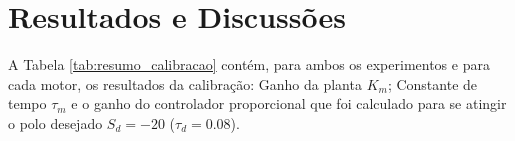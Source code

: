 \chapter[Resultados]{Resultados e Discussões}
\label{ch:resultados}






A Tabela \ref{tab:resumo_calibracao} contém, para ambos os experimentos e para cada motor, os resultados da calibração: Ganho da planta $K_m$; Constante de tempo $\tau_m$ e o ganho do controlador proporcional que foi calculado para se atingir o polo desejado $S_d = -20$ ($\tau_{d} = 0.08$).

